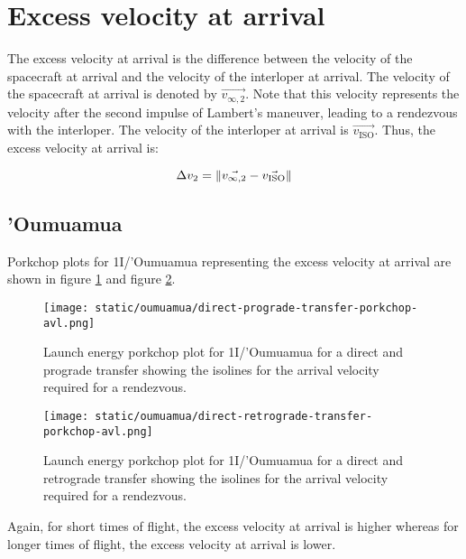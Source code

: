 \section{Excess velocity at arrival}

The excess velocity at arrival is the difference between the velocity of the
spacecraft at arrival and the velocity of the interloper at arrival. The
velocity of the spacecraft at arrival is denoted by $\vec{v_{\infty ,2}}$. Note
that this velocity represents the velocity after the second impulse of Lambert's
maneuver, leading to a rendezvous with the interloper. The velocity of the
interloper at arrival is $\vec{v_\text{ISO}}$. Thus, the excess velocity at
arrival is:

\begin{equation}
    \Delta v_2 = \lVert\vec{v_{\infty ,2}} - \vec{v_\text{ISO}}\rVert
\end{equation}


\subsection{'Oumuamua}

Porkchop plots for 1I/'Oumuamua representing the excess velocity at arrival are
shown in figure \ref{fig:oumuamua-direct-prograde-transfer-porkchop-avl} and figure
\ref{fig:oumuamua-direct-retrograde-transfer-porkchop-avl}.

\begin{figure}[H]
  \centering
  \texttt{[image: static/oumuamua/direct-prograde-transfer-porkchop-avl.png]}
        \caption[Direct and prograde launch energy porkchop for 'Oumuamua]{Launch energy porkchop plot for 1I/'Oumuamua for a direct and prograde
        transfer showing the isolines for the arrival velocity required for a rendezvous.}
  \label{fig:oumuamua-direct-prograde-transfer-porkchop-avl}
\end{figure}

\begin{figure}[H]
  \centering
  \texttt{[image: static/oumuamua/direct-retrograde-transfer-porkchop-avl.png]}
        \caption[Direct and prograde launch energy porkchop for
        'Oumuamua]{Launch energy porkchop plot for 1I/'Oumuamua for a direct and
        retrograde transfer showing the isolines for the arrival velocity required for a rendezvous.}
  \label{fig:oumuamua-direct-retrograde-transfer-porkchop-avl}
\end{figure}

Again, for short times of flight, the excess velocity at arrival is higher
whereas for longer times of flight, the excess velocity at arrival is lower. 

